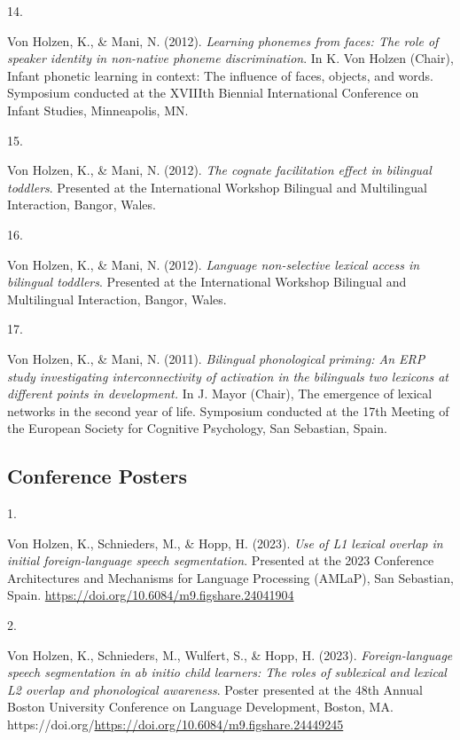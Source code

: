 \documentclass[10pt,a4paper,]{article}
\newlength{\cslhangindent}
\newlength{\csllabelwidth}
\newcommand{\CSLLeftMargin}[1]{\parbox[t]{\csllabelwidth}{\hfill #1~}}
\newcommand{\CSLRightInline}[1]{\parbox[t]{\linewidth - \cslhangindent - \csllabelwidth}{#1}\vspace{0.8ex}}
\begin{document}
\leavevmode{}%
\CSLLeftMargin{14. }%
\CSLRightInline{Von Holzen, K., \& Mani, N. (2012). \emph{Learning
phonemes from faces: The role of speaker identity in non-native phoneme
discrimination}. In K. Von Holzen (Chair), Infant phonetic learning in
context: The influence of faces, objects, and words. Symposium conducted
at the XVIIIth Biennial International Conference on Infant Studies,
Minneapolis, MN.}

\leavevmode{}%
\CSLLeftMargin{15. }%
\CSLRightInline{Von Holzen, K., \& Mani, N. (2012). \emph{The cognate
facilitation effect in bilingual toddlers}. Presented at the
International Workshop Bilingual and Multilingual Interaction, Bangor,
Wales.}

\leavevmode{}%
\CSLLeftMargin{16. }%
\CSLRightInline{Von Holzen, K., \& Mani, N. (2012). \emph{Language
non-selective lexical access in bilingual toddlers}. Presented at the
International Workshop Bilingual and Multilingual Interaction, Bangor,
Wales.}

\leavevmode{}%
\CSLLeftMargin{17. }%
\CSLRightInline{Von Holzen, K., \& Mani, N. (2011). \emph{Bilingual
phonological priming: An ERP study investigating interconnectivity of
activation in the bilinguals two lexicons at different points in
development.} In J. Mayor (Chair), The emergence of lexical networks in
the second year of life. Symposium conducted at the 17th Meeting of the
European Society for Cognitive Psychology, San Sebastian, Spain.}

\hypertarget{conference-posters}{%
\subsection{Conference Posters}\label{conference-posters}}

\hypertarget{bibliography}{}
\leavevmode{}%
\CSLLeftMargin{1. }%
\CSLRightInline{Von Holzen, K., Schnieders, M., \& Hopp, H. (2023).
\emph{Use of L1 lexical overlap in initial foreign-language speech
segmentation}. Presented at the 2023 Conference Architectures and
Mechanisms for Language Processing (AMLaP), San Sebastian, Spain.
\url{https://doi.org/10.6084/m9.figshare.24041904}}

\leavevmode{}%
\CSLLeftMargin{2. }%
\CSLRightInline{Von Holzen, K., Schnieders, M., Wulfert, S., \& Hopp, H.
(2023). \emph{Foreign-language speech segmentation in ab initio child
learners: The roles of sublexical and lexical L2 overlap and
phonological awareness}. Poster presented at the 48th Annual Boston
University Conference on Language Development, Boston, MA.
https://doi.org/\url{https://doi.org/10.6084/m9.figshare.24449245}}
\end{document}
